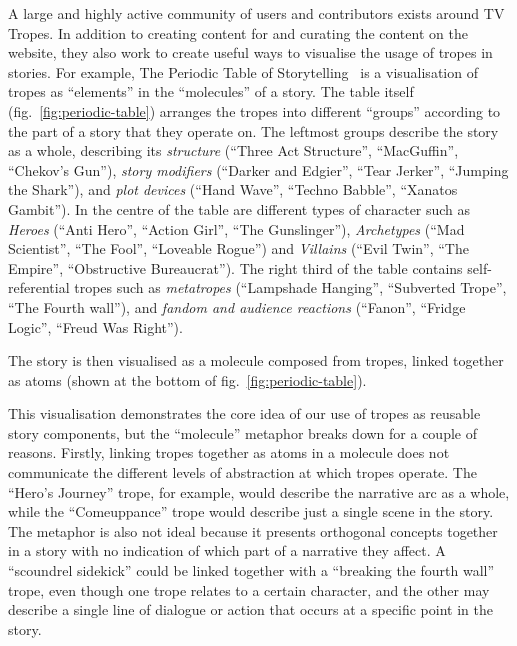 A large and highly active community of users and contributors exists around TV
Tropes. In addition to creating content for and curating the content on the
website, they also work to create useful ways to visualise the usage of tropes
in stories. For example, The Periodic Table of
Storytelling~\citep{periodicTableOfStorytelling} is a visualisation of tropes as
``elements'' in the ``molecules'' of a story. The table itself
(fig.~\ref{fig:periodic-table}) arranges the tropes into different ``groups''
according to the part of a story that they operate on. The leftmost groups
describe the story as a whole, describing its \emph{structure} (``Three Act
Structure'', ``MacGuffin'', ``Chekov's Gun''), \emph{story
  modifiers} (``Darker and Edgier'', ``Tear Jerker'', ``Jumping the Shark''),
and \emph{plot devices} (``Hand Wave'', ``Techno Babble'', ``Xanatos Gambit'').
In the centre of the table are different types of character such as
\emph{Heroes} (``Anti Hero'', ``Action Girl'', ``The Gunslinger''),
\emph{Archetypes} (``Mad Scientist'', ``The Fool'', ``Loveable Rogue'') and
\emph{Villains} (``Evil Twin'', ``The Empire'', ``Obstructive Bureaucrat''). The
right third of the table contains self-referential tropes such as
\emph{metatropes} (``Lampshade Hanging'', ``Subverted Trope'', ``The Fourth
wall''), and \emph{fandom and audience reactions} (``Fanon'', ``Fridge Logic'',
``Freud Was Right'').

The story is then visualised as a molecule composed from tropes, linked together as
atoms (shown at the bottom of fig.~\ref{fig:periodic-table}).

This visualisation demonstrates the core idea of our use of tropes as reusable
story components, but the ``molecule'' metaphor breaks down for a couple of
reasons. Firstly, linking tropes together as atoms in a molecule does not
communicate the different levels of abstraction at which tropes operate. The
``Hero's Journey'' trope, for example, would describe the narrative arc as a
whole, while the ``Comeuppance'' trope would describe just a single scene in the
story. The metaphor is also not ideal because it presents orthogonal concepts
together in a story with no indication of which part of a narrative they affect.
A ``scoundrel sidekick'' could be linked together with a ``breaking the fourth
wall'' trope, even though one trope relates to a certain character, and the
other may describe a single line of dialogue or action that occurs at a specific
point in the story. 

